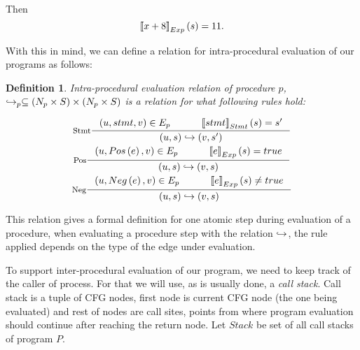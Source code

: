 \documentclass[..thesis.tex]{subfiles}
\newtheorem{defin}{Definition}[section]
\begin{document}
Then 
\begin{equation*}
\left\llbracket x + 8 \right\rrbracket_{Exp} \left( s \right) = 11 \text{.}    
\end{equation*}

With this in mind, we can define a relation for intra-procedural evaluation of our programs as follows:

\begin{defin}
Intra-procedural evaluation relation of procedure $p$, $\hookrightarrow_p \subseteq  \left( N_p  \times S \right)  \times \left( N_p \times S \right)$
is a relation for what following rules hold:

\addtolength{\jot}{2em}
\begin{gather*}
  \inference[Stmt]{ \lp u, stmt, v \rp \in E_{p}  \separ  \lllb stmt \rrrb_{Stmt} \lp s \rp = s'}{\lp u, s \rp \intraproc \lp v, s' \rp} \\
  \inference[Pos]{ \lp u, Pos \lp e \rp , v \rp \in E_{p} \separ \lllb e \rrrb_{Exp} \lp s \rp = true }{\lp u, s \rp \intraproc \lp v, s \rp} \\  
  \inference[Neg]{ \lp u, Neg \lp e \rp , v \rp \in E_{p} \separ \lllb e \rrrb_{Exp} \lp s \rp \neq true }{\lp u, s \rp \intraproc \lp v, s \rp} 
\end{gather*}
\addtolength{\jot}{-2em}

\end{defin}


This relation gives a formal definition for one atomic step during evaluation of a procedure, when evaluating a procedure step with the relation $\hookrightarrow$,
the rule applied depends on the type of the edge under evaluation. 


To support inter-procedural evaluation of our program, we need to keep track of the caller of process. For that we will use, as is usually done, a \textit{call stack}.
Call stack is a tuple of CFG nodes, first node is current CFG node (the one being evaluated) and rest of nodes are call sites, points from where program evaluation
 should continue after reaching the return node. Let $Stack$ be set of all call stacks of program $P$. 
\end{document}
